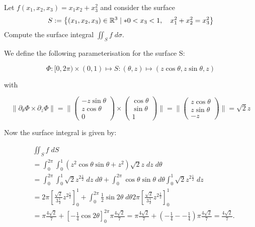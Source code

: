 \documentclass[11pt]{article}
\begin{document}
\begin{exercise}
    Let $f(x_1,x_2,x_3) = x_1 x_2 + x_3^2$ and consider the surface 
    \begin{gather*}
        S := \left\{ (x_1,x_2,x_3) \in \mathbb R^3 \suchthat* 0 < x_3 < 1, \quad x_1^2 + x_2^2 = x_3^2 \right\}
    \end{gather*}
    Compute the surface integral $\iint_S f \;d\sigma$. 
\end{exercise}
\begin{solution}
  We define the following parameterisation for the surface S:

$$
\Phi: [0,2\pi) \times (0,1) \mapsto S: (\theta,z)\mapsto (z\cos\theta, z\sin\theta,z)
$$

with

$$
\|\partial_{\theta}\Phi\times \partial_z\Phi\|  = \|\begin{pmatrix} -z\sin\theta \\ z\cos\theta\\0 \end{pmatrix} \times \begin{pmatrix} \cos\theta \\ \sin\theta \\1 \end{pmatrix}\| = \|\begin{pmatrix} z\cos\theta \\ z\sin\theta \\ -z \end{pmatrix}\| = \sqrt{2}z
$$

Now the surface integral is given by:

\begin{align*}
        &
	\iint_{S} f \;d S
        \\&
        = \int_0^{2\pi} \int_0^1 \left(z^2\cos\theta \sin\theta + z^2 \right)\sqrt{2}z\;d z \;d \theta
        \\&
        = \int_0^{2\pi} \int_0^1\sqrt{2}z^{2\frac{1}{2}} \;d z \;d \theta + \int_0^{2\pi} \cos\theta \sin\theta \;d \theta \int_0^1  \sqrt{2}z^{2\frac{1}{2}}\;d z 
        \\&
        =2\pi \left[\frac{\sqrt{2}}{3\frac{1}{2}} z^{2\frac{1}{2}}\right]_0^{1} + \int_0^{2\pi} \frac{1}{2}\sin2\theta \;d \theta 2\pi \left[\frac{\sqrt{2}}{3\frac{1}{2}} z^{2\frac{1}{2}}\right]_0^{1}
        \\&
        =\pi \frac{4\sqrt{2}}{7}+ \left[-\frac{1}{4}\cos2\theta\right]_{0}^{2\pi} \pi \frac{4\sqrt{2}}{7} = \pi \frac{4\sqrt{2}}{7}+ \left(-\frac{1}{4} -  - \frac{1}{4}\right) \pi \frac{4\sqrt{2}}{7} = \frac{4\sqrt{2}}{7} 
        .
    \end{align*}

\end{solution}
\end{document}
